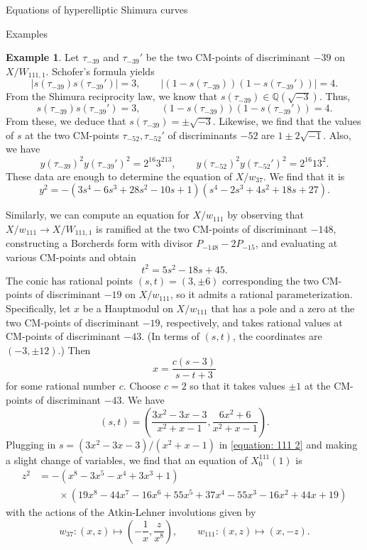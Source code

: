 \documentclass{amsart}
\newcounter{lemma}
\theoremstyle{definition}
\newtheorem{Example}[lemma]{Example}
\def\Q{\mathbb Q}
\begin{document}
\begin{section}{Equations of hyperelliptic Shimura curves}
\begin{subsection}{Examples}
\begin{Example}
  Let $\tau_{-39}$ and $\tau_{-39}'$ be the two CM-points of
  discriminant $-39$ on $X/W_{111,1}$. Schofer's formula yields
  $$
    |s(\tau_{-39})s(\tau_{-39}')|=3, \qquad
    |(1-s(\tau_{-39}))(1-s(\tau_{-39}'))|=4.
  $$
  From the Shimura reciprocity law, we know that
  $s(\tau_{-39})\in\Q(\sqrt{-3})$. Thus,
  $$
    s(\tau_{-39})s(\tau_{-39}')=3, \qquad
    (1-s(\tau_{-39}))(1-s(\tau_{-39}'))=4.
  $$
  From these, we deduce that $s(\tau_{-39})=\pm\sqrt{-3}$. Likewise,
  we find that the values of $s$ at the two CM-points
  $\tau_{-52},\tau_{-52}'$ of discriminants $-52$ are $1\pm
  2\sqrt{-1}$. Also, we have
  $$
    y(\tau_{-39})^2y(\tau_{-39}')^2=2^{16}3^213, \qquad
    y(\tau_{-52})^2y(\tau_{-52}')^2=2^{16}13^2.
  $$
  These data are enough to determine the equation of $X/w_{37}$. We
  find that it is
  \begin{equation} \label{equation: 111 2}
   y^2=-(3s^4-6s^3+28s^2-10s+1)(s^4-2s^3+4s^2+18s+27).
  \end{equation}

  Similarly, we can compute an equation for $X/w_{111}$ by observing
  that $X/w_{111}\to X/W_{111,1}$ is ramified at the two CM-points of
  discriminant $-148$, constructing a Borcherds form with divisor
  $P_{-148}-2P_{-15}$, and evaluating at various CM-points and obtain
  $$
    t^2=5s^2-18s+45.
  $$
  The conic has rational points $(s,t)=(3,\pm 6)$ corresponding the
  two CM-points of discriminant $-19$ on $X/w_{111}$, so it admits a
  rational parameterization. Specifically, let $x$ be a Hauptmodul on
  $X/w_{111}$ that has a pole and a zero at the two CM-points of
  discriminant $-19$, respectively, and takes rational values at
  CM-points of discriminant $-43$. (In terms of $(s,t)$, the
  coordinates are $(-3,\pm 12)$.) Then
  $$
    x=\frac{c(s-3)}{s-t+3}
  $$
  for some rational number $c$. Choose $c=2$ so that it takes values
  $\pm 1$ at the CM-points of discriminant $-43$. We have
  $$
    (s,t)=\left(\frac{3x^2-3x-3}{x^2+x-1},\frac{6x^2+6}{x^2+x-1}\right).
  $$
  Plugging in $s=(3x^2-3x-3)/(x^2+x-1)$ in \eqref{equation: 111 2} and
  making a slight change of variables, we find that an equation of
  $X_0^{111}(1)$ is
  \begin{equation*}
  \begin{split}
    z^2&=-(x^8-3x^5-x^4+3x^3+1) \\
    &\qquad\times(19x^8-44x^7-16x^6+55x^5+37x^4-55x^3-16x^2+44x+19)
  \end{split}
  \end{equation*}
  with the actions of the Atkin-Lehner involutions given by
  $$
    w_{37}:(x,z)\mapsto\left(-\frac1x,\frac z{x^8}\right), \qquad
    w_{111}:(x,z)\mapsto(x,-z).
  $$
\end{Example}


\end{subsection}
\end{section}
\end{document}
